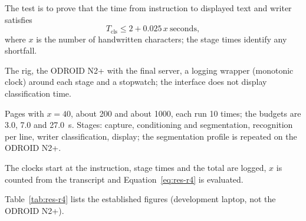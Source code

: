 
\medskip
\label{sec:res-qtp4}


            The test is to prove that the time from instruction to displayed text and writer satisfies
            \begin{equation}
            \label{eq:res-r4}
            T_{\mathrm{cls}}\le 2+0.025\,x\ \text{seconds},
            \end{equation}
            where $x$ is the number of handwritten characters; the stage times identify any shortfall.


            The rig, the ODROID N2+ with the final server, a logging wrapper (monotonic clock) around each stage and a stopwatch; the interface does not display classification time.


            Pages with $x=40$, about 200 and about 1000, each run 10 times; the budgets are 3.0, 7.0 and 27.0~s.
            Stages: capture, conditioning and segmentation, recognition per line, writer classification, display; the segmentation profile is repeated on the ODROID N2+.


            The clocks start at the instruction, stage times and the total are logged, $x$ is counted from the transcript and Equation~\ref{eq:res-r4} is evaluated.


            Table~\ref{tab:res-r4} lists the established figures (development laptop, not the ODROID N2+).

